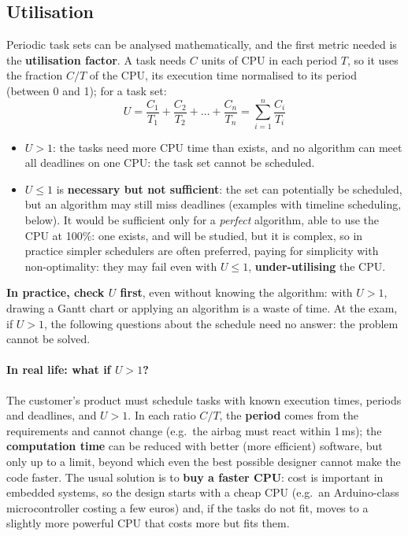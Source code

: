 \subsection{Utilisation}
Periodic task sets can be analysed mathematically, and the first metric needed is the \textbf{utilisation factor}. A task needs $C$ units of CPU in each period $T$, so it uses the fraction $C/T$ of the CPU, its execution time normalised to its period (between 0 and 1); for a task set:
    \[
    U = \frac{C_1}{T_1} + \frac{C_2}{T_2} + \dots + \frac{C_n}{T_n} = \sum_{i=1}^{n} \frac{C_i}{T_i}
    \]
\begin{itemize}
    \item $U > 1$: the tasks need more CPU time than exists, and no algorithm can meet all deadlines on one CPU: the task set cannot be scheduled.
    \item $U \le 1$ is \textbf{necessary but not sufficient}: the set can potentially be scheduled, but an algorithm may still miss deadlines (examples with timeline scheduling, below). It would be sufficient only for a \emph{perfect} algorithm, able to use the CPU at 100\%: one exists, and will be studied, but it is complex, so in practice simpler schedulers are often preferred, paying for simplicity with non-optimality: they may fail even with $U \le 1$, \textbf{under-utilising} the CPU.
\end{itemize}
\textbf{In practice, check $U$ first}, even without knowing the algorithm: with $U > 1$, drawing a Gantt chart or applying an algorithm is a waste of time. At the exam, if $U > 1$, the following questions about the schedule need no answer: the problem cannot be solved.

\paragraph{In real life: what if $U > 1$?} The customer's product must schedule tasks with known execution times, periods and deadlines, and $U > 1$. In each ratio $C/T$, the \textbf{period} comes from the requirements and cannot change (e.g.\ the airbag must react within 1\,ms); the \textbf{computation time} can be reduced with better (more efficient) software, but only up to a limit, beyond which even the best possible designer cannot make the code faster. The usual solution is to \textbf{buy a faster CPU}: cost is important in embedded systems, so the design starts with a cheap CPU (e.g.\ an Arduino-class microcontroller costing a few euros) and, if the tasks do not fit, moves to a slightly more powerful CPU that costs more but fits them.

